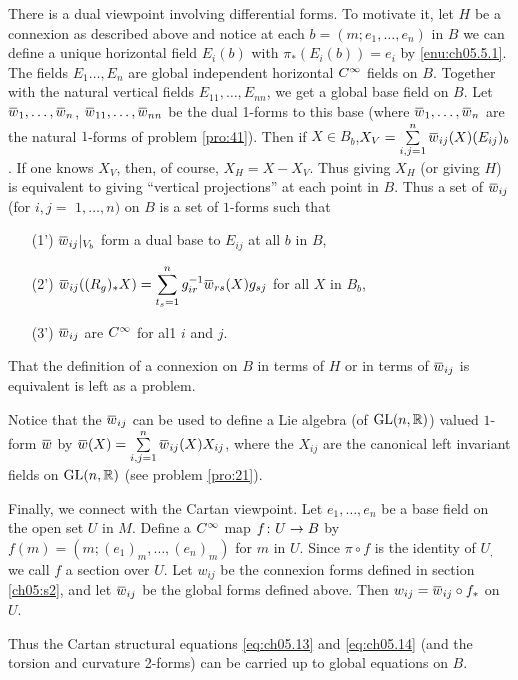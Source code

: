 \documentclass[../main]{subfiles}
\begin{document}
There is a dual viewpoint involving differential forms. To motivate it, let $H$ be a connexion as described above and notice at each $b=\left(m ; e_{1}, \ldots, e_{n}\right)$ in $B$ we can define a unique horizontal field $E_{i}(b)$ with $\pi_{\ast}\left(E_{i}(b)\right)=e_{i}$ by \ref{enu:ch05.5.1}. The fields $E_{1} \ldots, E_{n}$ are global independent horizontal $C^\infty$ fields on $B$. Together with the natural vertical fields $E_{11}, \ldots, E_{n n}$, we get a global base field on $B$. Let $\xoverline{w}_{1}, \ldots, \xoverline{w}_{n}$, $\xoverline{w}_{11}, \ldots, \xoverline{w}_{n n}$ be the dual 1-forms to this base (where $\xoverline{w}_{1}, \ldots, \xoverline{w}_{n}$ are the natural $1$-forms of problem \ref{pro:41}). Then if $X\in B_{b}$,$ X_{V}=\sum\limits_{i, j=1}^{n} \xoverline{w}_{i j}(X)(E_{i j})_{b}$. If one knows $X_{V}$, then, of course, $X_{H}=X-X_{V}$. Thus giving $X_{H}$ (or giving $H$) is equivalent to giving ``vertical projections'' at each point in $B$. Thus a set of  $\xoverline{w}_{i j}$ (for $i, j=$ $1, \ldots, n)$ on $B$ is a set of $1$-forms such that

\begin{enumerate}
\item[(1')] $\xoverline{w}_{i j}\vert_{V_{b}}$ form a dual base to $E_{i j}$ at all $b$ in $B$,

\item[(2')]$ \xoverline{w}_{i j}((R_{g})_{\ast} X)=\displaystyle\sum\limits_{t_{s}=1}^{n} g_{i r}^{-1} \xoverline{w}_{r s}(X) g_{s j}$ for all $X$ in $B_{b}$,

\item[(3')]$ \xoverline{w}_{i j}$ are $C^\infty$ for al1 $i$ and $j .$
\end{enumerate}
That the definition of a connexion on $B$ in terms of $H$ or in terms of $\xoverline{w}_{i j}$ is equivalent is left as a problem.

Notice that the $\xoverline{w}_{i j}$ can be used to define a Lie algebra (of $\mathrm{GL}(n, \mathbb{R})$) valued $1$-form $\xoverline{w}$ by $\xoverline{w}(X)=\sum\limits_{i, j=1}^{n} \xoverline{w}_{i j}(X) X_{i j}$, where the $X_{i j}$ are the canonical left invariant fields on $\mathrm{GL}(n, \mathbb{R})$ (see problem \ref{pro:21}).

Finally, we connect with the Cartan viewpoint. Let $e_{1}, \ldots, e_{n}$ be a base field on the open set $U$ in $M$. Define a $C^\infty$ map $f\colon U \to B$ by $f(m)=\left(m ;\left(e_{1}\right)_{m}, \ldots,\left(e_{n}\right)_{m}\right)$ for $m$ in $U$. Since $\pi \circ f$ is the identity of $U_{,}$ we call $f$ a section over $U$. Let $w_{i j}$ be the connexion forms defined in section \ref{ch05:s2}, and let $\xoverline{w}_{i j}$ be the global forms defined above. Then $w_{i j}=\xoverline{w}_{i j} \circ f_{\ast}$ on $U$.

Thus the Cartan structural equations \ref{eq:ch05.13} and \ref{eq:ch05.14} (and the torsion and curvature 2-forms) can be carried up to global equations on $B$.
\end{document}
